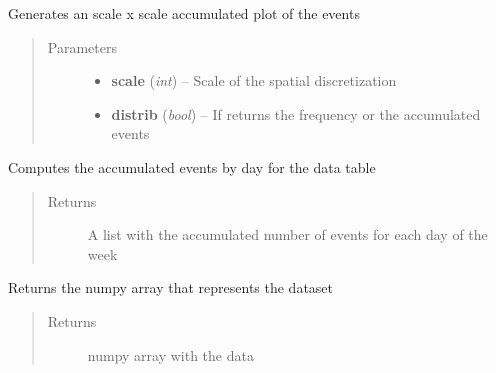 \documentclass[letterpaper,10pt,english]{sphinxmanual}
\begin{document}
\begin{fulllineitems}
\begin{fulllineitems}
\end{fulllineitems}


\begin{fulllineitems}
\label{index:SuperHub.STData.STData.contingency}
Generates an scale x scale accumulated plot of the events
\begin{quote}\begin{description}
\item[{Parameters}] \leavevmode\begin{itemize}
\item {} 
\textbf{scale} (\emph{int}) -- Scale of the spatial discretization

\item {} 
\textbf{distrib} (\emph{bool}) -- If returns the frequency or the accumulated events

\end{itemize}

\end{description}\end{quote}

\end{fulllineitems}


\begin{fulllineitems}
\label{index:SuperHub.STData.STData.daily_table}
Computes the accumulated events by day for the data table
\begin{quote}\begin{description}
\item[{Returns}] \leavevmode
A list with the accumulated number of events for each day of the week

\end{description}\end{quote}

\end{fulllineitems}


\begin{fulllineitems}
\label{index:SuperHub.STData.STData.get_dataset}
Returns the numpy array that represents the dataset
\begin{quote}\begin{description}
\item[{Returns}] \leavevmode
numpy array with the data


\end{description}
\end{quote}
\end{fulllineitems}
\end{fulllineitems}
\end{document}
